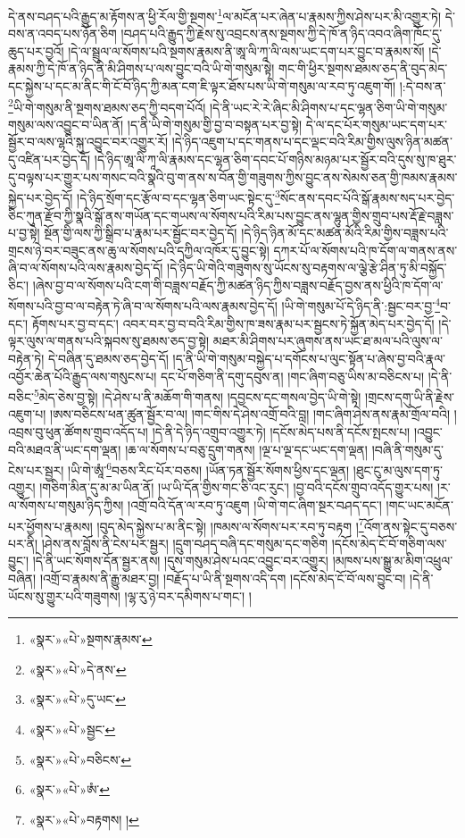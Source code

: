 དེ་ནས་བཤད་པའི་རྒྱུད་མ་རྟོགས་ན་ཕྱི་རོལ་གྱི་སྔགས་\footnote{«སྣར་»«པེ་»སྔགས་རྣམས་}ལ་མངོན་པར་ཞེན་པ་རྣམས་ཀྱིས་ཤེས་པར་མི་འགྱུར་ཏེ། དེ་བས་ན་འབད་པས་ཉོན་ཅིག །བཤད་པའི་རྒྱུད་ཀྱི་རྗེས་སུ་འབྲངས་ནས་སྔགས་ཀྱི་དེ་ཁོ་ན་ཉིད་འབའ་ཞིག་ཁོང་དུ་ཆུད་པར་བྱའོ། །དེ་ལ་སྦྲུལ་ལ་སོགས་པའི་སྔགས་རྣམས་ནི་ཨཱ་ལི་ཀཱ་ལི་ལས་ཡང་དག་པར་བྱུང་བ་རྣམས་སོ། །དེ་རྣམས་ཀྱི་དེ་ཁོ་ན་ཉིད་ནི་མི་ཤིགས་པ་ལས་བྱུང་བའི་ཡི་གེ་གསུམ་སྟེ། གང་གི་ཕྱིར་སྔགས་ཐམས་ཅད་ནི་བུད་མེད་དང་སྐྱེས་པ་དང་མ་ནིང་གི་ངོ་བོ་ཉིད་ཀྱི་མན་ངག་ཇི་ལྟར་ཐོས་པས་ཡི་གེ་གསུམ་ལ་རབ་ཏུ་འཇུག་གོ། །:དེ་བས་ན་\footnote{«སྣར་»«པེ་»དེ་ནས་}ཡི་གེ་གསུམ་ནི་སྔགས་ཐམས་ཅད་ཀྱི་བདག་པོའོ། །དེ་ནི་ཡང་རེ་རེ་ཞིང་མི་ཤིགས་པ་དང་ལྷན་ཅིག་ཡི་གེ་གསུམ་གསུམ་ལས་འབྱུང་བ་ཡིན་ནོ། །ད་ནི་ཡི་གེ་གསུམ་གྱི་བྱ་བ་བསྟན་པར་བྱ་སྟེ། དེ་ལ་དང་པོར་གསུམ་ཡང་དག་པར་སྦྱོར་བ་ལས་ལྷའི་སྐུ་འབྱུང་བར་འགྱུར་རོ། །དེ་ཉིད་འཇུག་པ་དང་གནས་པ་དང་ལྡང་བའི་རིམ་གྱིས་ལུས་ཉིན་མཚན་དུ་འཛིན་པར་བྱེད་དོ། །དེ་ཉིད་ཨཱ་ལི་ཀཱ་ལི་རྣམས་དང་ལྷན་ཅིག་དབང་པོ་གཉིས་མཉམ་པར་སྦྱོར་བའི་དུས་སུ་ཁ་ཐུར་དུ་བལྟས་པར་གྱུར་པས་གསང་བའི་སྣའི་བུ་ག་ནས་ས་བོན་གྱི་གཟུགས་ཀྱིས་བྱུང་ནས་སེམས་ཅན་གྱི་ཁམས་རྣམས་སྐྱེད་པར་བྱེད་དོ། །དེ་ཉིད་སྲོག་དང་རྩོལ་བ་དང་ལྷན་ཅིག་ཡང་སྟེང་དུ་\footnote{«སྣར་»«པེ་»དུ་ཡང་}སོང་ནས་དབང་པོའི་སྒོ་རྣམས་སད་པར་བྱེད་ཅིང་ཀུན་རྫོབ་ཀྱི་སྣའི་སྒོ་ནས་གཡོན་དང་གཡས་ལ་སོགས་པའི་རིམ་པས་བྱུང་ནས་ལྷུན་གྱིས་གྲུབ་པས་རྡོ་རྗེ་བཟླས་པ་བྱ་སྟེ། སྔོན་གྱི་ལས་ཀྱི་སྒྲིབ་པ་རྣམ་པར་སྦྱོང་བར་བྱེད་དོ། །དེ་ཉིད་ཉིན་མོ་དང་མཚན་མོའི་རིམ་གྱིས་བཟླས་པའི་གྲངས་ཉེ་བར་བཟུང་ནས་ཆུ་ལ་སོགས་པའི་དཀྱིལ་འཁོར་དུ་བྱུང་སྟེ། དཀར་པོ་ལ་སོགས་པའི་ཁ་དོག་ལ་གནས་ནས་ཞི་བ་ལ་སོགས་པའི་ལས་རྣམས་བྱེད་དོ། །དེ་ཉིད་ཡི་གེའི་གཟུགས་སུ་ཡོངས་སུ་བརྟགས་ལ་ལྕེ་རྩེ་ཤིན་ཏུ་མི་བསྐྱོད་ཅིང་། །ཞེས་བྱ་བ་ལ་སོགས་པའི་ངག་གི་བཟླས་བརྗོད་ཀྱི་མཚན་ཉིད་ཀྱིས་བཟླས་བརྗོད་བྱས་ནས་ཕྱིའི་ཁ་དོག་ལ་སོགས་པའི་བྱ་བ་ལ་བརྟེན་ཏེ་ཞི་བ་ལ་སོགས་པའི་ལས་རྣམས་བྱེད་དོ། །ཡི་གེ་གསུམ་པོ་དེ་ཉིད་ནི་:སྦྱང་བར་བྱ་\footnote{«སྣར་»«པེ་»སྦྱང་}བ་དང་། རྟོགས་པར་བྱ་བ་དང་། འབར་བར་བྱ་བ་བའི་རིམ་གྱིས་ཁ་ཟས་རྣམ་པར་སྦྱངས་ཏེ་སྐྱོན་མེད་པར་བྱེད་དོ། །དེ་ལྟར་ལུས་ལ་གནས་པའི་སྐབས་སུ་ཐམས་ཅད་བྱ་སྟེ། མཐར་མི་ཤིགས་པར་ཞུགས་ནས་ཡང་ཐ་མལ་པའི་ལུས་ལ་བརྟེན་ཏེ། དེ་བཞིན་དུ་ཐམས་ཅད་བྱེད་དོ། །ད་ནི་ཡི་གེ་གསུམ་བསྐྱེད་པ་དགོངས་པ་ལུང་སྟོན་པ་ཞེས་བྱ་བའི་རྣལ་འབྱོར་ཆེན་པོའི་རྒྱུད་ལས་གསུངས་པ། དང་པོ་གཅིག་ནི་དགུ་དབུས་ན། །གང་ཞིག་བཅུ་ཡིས་མ་བཅིངས་པ། །དེ་ནི་བཅིང་\footnote{«སྣར་»«པེ་»བཅིངས་}མེད་ཅེས་བྱ་སྟེ། །དེ་ཤེས་པ་ནི་མཆོག་གི་གནས། །དབྱངས་དང་གསལ་བྱེད་ཡི་གེ་སྟེ། །གྲངས་དགུ་ཡི་ནི་རྗེས་འཇུག་པ། །ཨས་བཅིངས་ཕན་ཚུན་སྦྱོར་བ་ལ། །གང་གིས་དེ་ཤེས་འགྲོ་བའི་བླ། །གང་ཞིག་ཤེས་ནས་རྣམ་གྲོལ་བའི། །འབྲས་བུ་ཕུན་ཚོགས་གྲུབ་འདོད་པ། །དེ་ནི་དེ་ཉིད་འགྲུབ་འགྱུར་ཏེ། །དངོས་མེད་པས་ནི་དངོས་སྤངས་པ། །འབྱུང་བའི་མཐའ་ནི་ཡང་དག་ལྡན། །ཆ་ལ་སོགས་པ་བཅུ་དྲུག་གནས། །ལྔ་པ་ལྔ་དང་ཡང་དག་ལྡན། །བཞི་ནི་གསུམ་དུ་ངེས་པར་སྦྱར། །ཡི་གེ་ཨཱཾ་\footnote{«སྣར་»«པེ་»ཨཾ་}བཅས་རིང་པོར་བཅས། །ཡོན་ཏན་སྦྱོར་སོགས་ཕྱིས་དང་ལྡན། །ཐུང་ངུ་མ་ལུས་དག་ཏུ་འགྱུར། །གཅིག་མིན་དུ་མ་མ་ཡིན་ནོ། །ཡ་ཡི་དོན་གྱིས་གང་ཅི་འང་རུང་། །བྱ་བའི་དངོས་གྲུབ་འདོད་གྱུར་པས། །ར་ལ་སོགས་པ་གསུམ་ཉིད་ཀྱིས། །འགྲོ་བའི་དོན་ལ་རབ་ཏུ་འཇུག །ཡི་གེ་གང་ཞིག་སྔར་བཤད་དང་། །གང་ཡང་མངོན་པར་ཕྱོགས་པ་རྣམས། །བུད་མེད་སྐྱེས་པ་མ་ནིང་སྟེ། །ཁམས་ལ་སོགས་པར་རབ་ཏུ་བརྟག །\footnote{«སྣར་»«པེ་»བརྟགས། །}འོག་ནས་སྟེང་དུ་བཅས་པར་ནི། །ཤེས་ནས་བློས་ནི་ངེས་པར་སྦྱར། །དྲུག་བཤད་བཞི་དང་གསུམ་དང་གཅིག །དངོས་མེད་ངོ་བོ་གཅིག་ལས་བྱུང་། །དེ་ནི་ཡང་སོགས་དོན་སྦྱར་ནས། །དུས་གསུམ་ཤེས་པའང་འབྱུང་བར་འགྱུར། །མཁས་པས་སྒྱུ་མ་མིག་འཕྲུལ་བཞིན། །འགྲོ་བ་རྣམས་ནི་རྒྱུ་མཐར་བྱ། །བརྗོད་པ་ཡི་ནི་སྔགས་འདི་དག །དངོས་མེད་ངོ་བོ་ལས་བྱུང་བ། །དེ་ནི་ཡོངས་སུ་གྱུར་པའི་གཟུགས། །ལྷ་རུ་ཉེ་བར་དམིགས་པ་གང་། །
